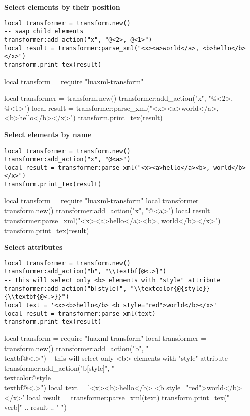 \documentclass{ltxdoc}
\begin{document}
\noindent\textbf{Select elements by their position}

\begin{verbatim}
local transformer = transform.new()
-- swap child elements
transformer:add_action("x", "@<2>, @<1>")
local result = transformer:parse_xml("<x><a>world</a>, <b>hello</b></x>")
transform.print_tex(result)
\end{verbatim}

\begin{framed}
\begin{luacode*}

local transform = require "luaxml-transform"

local transformer = transform.new()
transformer:add_action("x", "@<2>, @<1>")
local result = transformer:parse_xml("<x><a>world</a>, <b>hello</b></x>")
transform.print_tex(result)
\end{luacode*}
\end{framed}


\noindent\textbf{Select elements by name}
\begin{verbatim}
local transformer = transform.new()
transformer:add_action("x", "@<a>")
local result = transformer:parse_xml("<x><a>hello</a><b>, world</b></x>")
transform.print_tex(result)
\end{verbatim}
\begin{framed}
\begin{luacode*}

local transform = require "luaxml-transform"
local transformer = transform.new()
transformer:add_action("x", "@<a>")
local result = transformer:parse_xml("<x><a>hello</a><b>, world</b></x>")
transform.print_tex(result)
\end{luacode*}
\end{framed}

\noindent\textbf{Select attributes}
\begin{verbatim}
local transformer = transform.new()
transformer:add_action("b", "\\textbf{@<.>}")
-- this will select only <b> elements with "style" attribute
transformer:add_action("b[style]", "\\textcolor{@{style}}{\\textbf{@<.>}}")
local text = '<x><b>hello</b> <b style="red">world</b></x>'
local result = transformer:parse_xml(text)
transform.print_tex(result)
\end{verbatim}
\begin{framed}
\begin{luacode*}

local transform = require "luaxml-transform"
local transformer = transform.new()
transformer:add_action("b", "\\textbf{@<.>}")
-- this will select only <b> elements with "style" attribute
transformer:add_action("b[style]", "\\textcolor{@{style}}{\\textbf{@<.>}}")
local text = '<x><b>hello</b> <b style="red">world</b></x>'
local result = transformer:parse_xml(text)
transform.print_tex("\\verb|" .. result .. "|")
\end{luacode*}
\end{framed}
\end{document}
